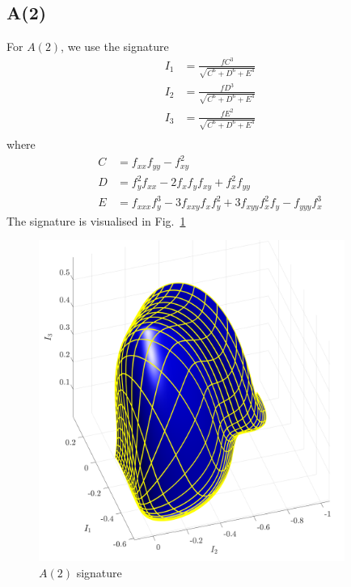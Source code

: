 \documentclass[11pt]{article}
\begin{document}
\subsection{A(2)}
For $A(2)$, we use the signature
\begin{equation}\label{eq:a2sig}
  \begin{split}
    I_1 &= \frac{fC^3}{\sqrt{C^6 + D^6 + E^4}} \\
    I_2 &= \frac{fD^3}{\sqrt{C^6 + D^6 + E^4}} \\
    I_3 &= \frac{fE^2}{\sqrt{C^6 + D^6 + E^4}} \\
  \end{split}
\end{equation}
where
\begin{equation*}
  \begin{split}
    C &= f_{xx}f_{yy} - f_{xy}^2 \\
    D &= f_y^2f_{xx} - 2f_xf_y f_{xy} + f_x^2f_{yy} \\
    E &= f_{xxx}f_y^3 - 3f_{xxy}f_x f_y^2 + 3f_{xyy}f_x^2 f_y - f_{yyy}f_x^3
  \end{split}
\end{equation*}
The signature is visualised in Fig.~\ref{fig:a2signature}
\begin{figure}
  \centering
    \includegraphics[width=10cm]{figures/A2_signature}
  \caption{$A(2)$ signature}
  \label{fig:a2signature}
\end{figure}
\end{document}
